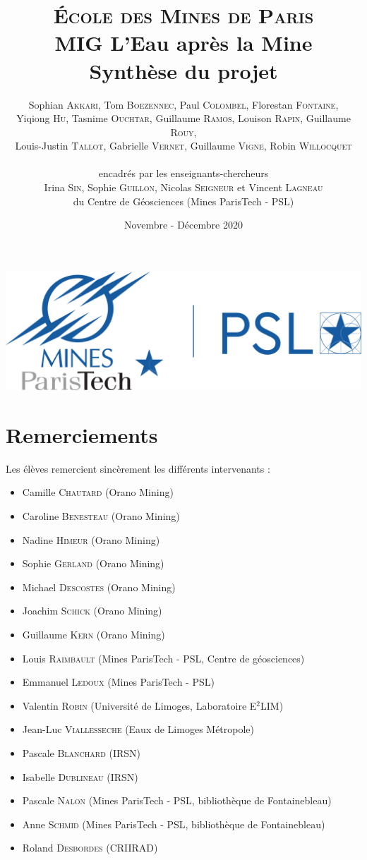 \documentclass{article}
\title{ \textbf{ {\color{couleurmines}
\Huge{\textsc{École des Mines de Paris}}\\
\vspace{1.5 cm}
MIG L'Eau après la Mine\\\vspace{1 cm}Synthèse du projet}}
\vspace{1 cm}
}
\author{%
Sophian \textsc{Akkari},
Tom \textsc{Boezennec}, 
Paul \textsc{Colombel}, 
Florestan \textsc{Fontaine},\\
Yiqiong \textsc{Hu}, 
Tasnime \textsc{Ouchtar}, 
Guillaume \textsc{Ramos}, 
Louison \textsc{Rapin}, 
Guillaume \textsc{Rouy},\\ 
Louis-Justin \textsc{Tallot}, 
Gabrielle \textsc{Vernet}, 
Guillaume \textsc{Vigne}, 
Robin \textsc{Willocquet}\\
\\
encadrés par les enseignants-chercheurs \\
Irina \textsc{Sin}, 
Sophie \textsc{Guillon}, 
Nicolas \textsc{Seigneur}
et Vincent \textsc{Lagneau} \\
du Centre de Géosciences (Mines ParisTech - PSL)}
\date{Novembre - Décembre 2020}
\begin{document}

\maketitle
\thispagestyle{empty}
\vspace{1 cm}
\begin{center}
    \includegraphics[width = 0.4\linewidth]{logoMPT.png}
\end{center}
\newpage
{}

\section*{Remerciements}
Les élèves remercient sincèrement les différents intervenants : 
\begin{itemize}
    \item Camille \textsc{Chautard} (Orano Mining)
    \item Caroline \textsc{Benesteau} (Orano Mining)
    \item Nadine \textsc{Himeur} (Orano Mining)
    \item Sophie \textsc{Gerland} (Orano Mining)
    \item Michael \textsc{Descostes} (Orano Mining)
    \item Joachim \textsc{Schick} (Orano Mining)
    \item Guillaume \textsc{Kern} (Orano Mining)
    \item Louis \textsc{Raimbault} (Mines ParisTech - PSL, Centre de géosciences) 
    \item  Emmanuel \textsc{Ledoux} (Mines ParisTech - PSL)
    \item Valentin \textsc{Robin} (Université de Limoges, Laboratoire E$^2$LIM) 
    \item Jean-Luc \textsc{Viallesseche} (Eaux de Limoges Métropole)
    \item Pascale \textsc{Blanchard} (IRSN)  
    \item Isabelle \textsc{Dublineau} (IRSN)    
    \item  Pascale \textsc{Nalon} (Mines ParisTech - PSL, bibliothèque de Fontainebleau)
    \item Anne \textsc{Schmid} (Mines ParisTech - PSL, bibliothèque de Fontainebleau)
    \item Roland \textsc{Desbordes} (CRIIRAD)
\end{itemize}
\end{document}
